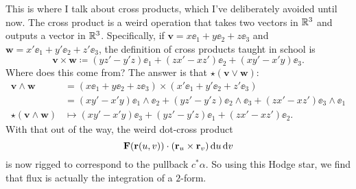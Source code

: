 \begin{itemize}
	This is where I talk about cross products, which I've deliberately avoided until now.
	The cross product is a weird operation that takes two vectors in $\mathbb R^3$
	and outputs a vector in $\mathbb R^3$.
	Specifically, if $\mathbf{v} = x \ee_1 + y \ee_2 + z \ee_3$
	and $\mathbf{w} = x' \ee_1 + y' \ee_2 + z' \ee_3$,
	the definition of cross products taught in school is
	\[ \mathbf{v} \times \mathbf{w} \coloneqq (yz'-y'z) \ee_1 + (zx'-xz') \ee_2 + (xy'-x'y) \ee_3. \]
	Where does this come from?
	The answer is that $\star(\mathbf{v} \vee \mathbf{w})$:
	\begin{align*}
		\mathbf{v} \wedge \mathbf{w} &=
		(x \ee_1 + y \ee_2 + z \ee_3) \times (x' \ee_1 + y' \ee_2 + z' \ee_3) \\
		&= (xy'-x'y) \ee_1 \wedge \ee_2
		+ (yz'-y'z) \ee_2 \wedge \ee_3
		+ (zx'-xz') \ee_3 \wedge \ee_1 \\
		\star(\mathbf{v} \wedge \mathbf{w})
		&\mapsto (xy'-x'y) \ee_3
		+ (yz'-y'z) \ee_1
		+ (zx'-xz') \ee_2.
	\end{align*}
	With that out of the way, the weird dot-cross product
	\[ \mathbf{F}(\mathbf{r}(u,v)) \cdot \left( \mathbf{r}_u \times \mathbf{r}_v \right) \odif{u} \odif{v} \]
	is now rigged to correspond to the pullback $c^\ast\alpha$.
	So using this Hodge star, we find that flux is actually the integration of a $2$-form.
\end{itemize}

